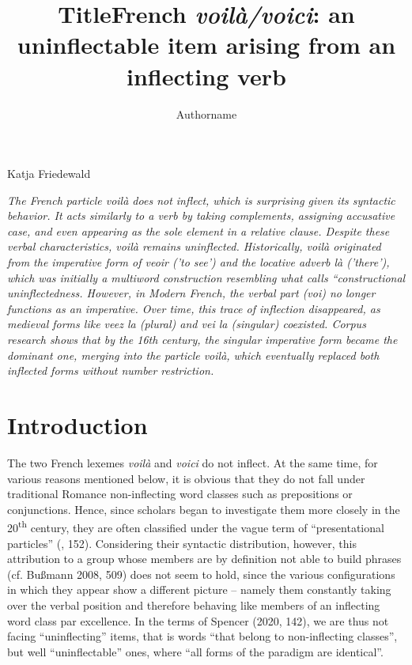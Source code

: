 \documentclass[output=paper]{langscibook}
\author{Authorname\orcid{}\affiliation{}}
\title{Title}
\begin{document}
\maketitle 

\title{French \textit{voilà/voici}: an uninflectable item arising from an inflecting verb}

Katja Friedewald

\textit{The French particle voilà does not inflect, which is surprising given its syntactic behavior. It acts similarly to a verb by taking complements, assigning accusative case, and even appearing as the sole element in a relative clause. Despite these verbal characteristics, voilà remains uninflected. Historically, voilà originated from the imperative form of veoir ('to see') and the locative adverb là ('there'), which was initially a multiword construction resembling what \citet{Spencer2020} calls “constructional uninflectedness. However, in Modern French, the verbal part (voi) no longer functions as an imperative. Over time, this trace of inflection disappeared, as medieval forms like veez la (plural) and vei la (singular) coexisted. Corpus research shows that by the 16th century, the singular imperative form became the dominant one, merging into the particle voilà, which eventually replaced both inflected forms without number restriction.}

\section{Introduction}

The two French lexemes \textit{voilà} and \textit{voici} do not inflect. At the same time, for various reasons mentioned below, it is obvious that they do not fall under traditional Romance non-inflecting word classes such as prepositions or conjunctions. Hence, since scholars began to investigate them more closely in the 20\textsuperscript{th} century, they are often classified under the vague term of “presentational particles” (\citealt{Petit2010}, 152). Considering their syntactic distribution, however, this attribution to a group whose members are by definition not able to build phrases (cf. Bußmann 2008, 509) does not seem to hold, since the various configurations in which they appear show a different picture – namely them constantly taking over the verbal position and therefore behaving like members of an inflecting word class par excellence. In the terms of Spencer (2020, 142), we are thus not facing “uninflecting” items, that is words “that belong to non-inflecting classes”, but well “uninflectable” ones, where “all forms of the paradigm are identical”. 
\end{document}
